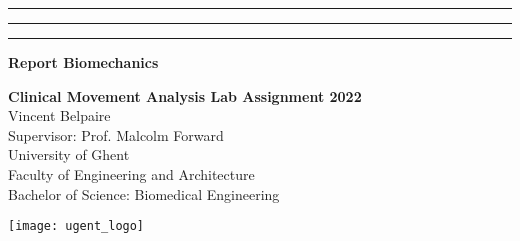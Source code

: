 {\color{ugent_blue} \hrule\hrule\hrule}

\vspace*{-0.43mm}
\colorbox{ugent_blue}{\color{white} \bf Report Biomechanics}\\

\noindent\begin{minipage}{0.7\textwidth}%
{\LARGE \bf \color{ugent_blue} Clinical Movement Analysis Lab Assignment 2022}\\[2mm]

%
{\large Vincent Belpaire}\\
{Supervisor: Prof. Malcolm Forward}\\


{\small University of Ghent}\\
{\small Faculty of Engineering and Architecture}\\
{\small Bachelor of Science: Biomedical Engineering}\\
\end{minipage}%
\hfill%
\begin{minipage}{0.3\textwidth}
\vspace{-2.2cm}
\begin{center}
\texttt{[image: ugent\_logo]}
\end{center}
\end{minipage}\\